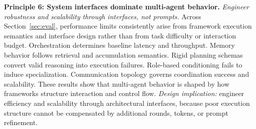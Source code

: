 \smallskip
\noindent\textbf{Principle 6: System interfaces dominate multi-agent behavior.}
\emph{Engineer robustness and scalability through interfaces, not prompts.}
Across Section~\ref{sec:eval}, performance limits consistently arise from framework execution semantics and interface design rather than from task difficulty or interaction budget. Orchestration determines baseline latency and throughput. Memory behavior follows retrieval and accumulation semantics. Rigid planning schemas convert valid reasoning into execution failures. Role-based conditioning fails to induce specialization. Communication topology governs coordination success and scalability. These results show that multi-agent behavior is shaped by how frameworks structure interaction and control flow. \emph{Design implication:} engineer efficiency and scalability through architectural interfaces, because poor execution structure cannot be compensated by additional rounds, tokens, or prompt refinement.\shorten 



